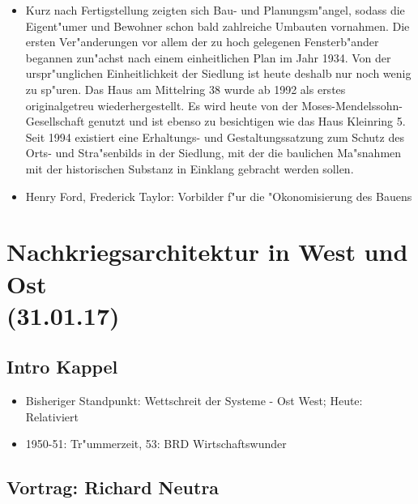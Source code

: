 \documentclass[a5paper]{scrartcl}
\begin{document}
\begin{itemize}
  \item Kurz nach Fertigstellung zeigten sich Bau- und Planungsm"angel, sodass die Eigent"umer und Bewohner schon bald zahlreiche Umbauten vornahmen. Die ersten Ver"anderungen vor allem der zu hoch gelegenen Fensterb"ander begannen zun"achst nach einem einheitlichen Plan im Jahr 1934. Von der urspr"unglichen Einheitlichkeit der Siedlung ist heute deshalb nur noch wenig zu sp"uren. Das Haus am Mittelring 38 wurde ab 1992 als erstes originalgetreu wiederhergestellt. Es wird heute von der Moses-Mendelssohn-Gesellschaft genutzt und ist ebenso zu besichtigen wie das Haus Kleinring 5. Seit 1994 existiert eine Erhaltungs- und Gestaltungssatzung zum Schutz des Orts- und Stra"senbilds in der Siedlung, mit der die baulichen Ma"snahmen mit der historischen Substanz in Einklang gebracht werden sollen.
  \item Henry Ford, Frederick Taylor: Vorbilder f"ur die "Okonomisierung des Bauens
\end{itemize}


\section{Nachkriegsarchitektur in West und Ost\\(31.01.17)}

\subsection{Intro Kappel}

\begin{itemize}
  \item Bisheriger Standpunkt: Wettschreit der Systeme - Ost West; Heute: Relativiert
  \item 1950-51: Tr"ummerzeit, 53: BRD Wirtschaftswunder
\end{itemize}


\subsection{Vortrag: Richard Neutra}
\end{document}
